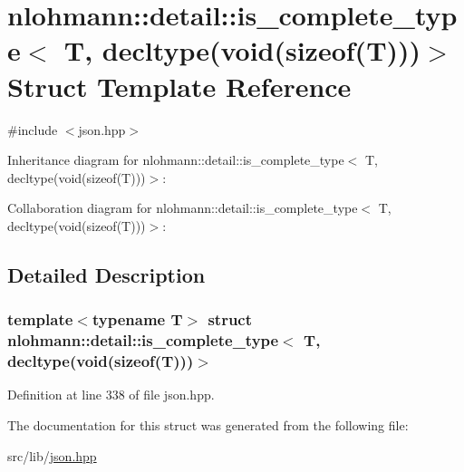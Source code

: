 \hypertarget{structnlohmann_1_1detail_1_1is__complete__type_3_01_t_00_01decltype_07void_07sizeof_07_t_08_08_08_4}{}\section{nlohmann\+:\+:detail\+:\+:is\+\_\+complete\+\_\+type$<$ T, decltype(void(sizeof(T)))$>$ Struct Template Reference}
\label{structnlohmann_1_1detail_1_1is__complete__type_3_01_t_00_01decltype_07void_07sizeof_07_t_08_08_08_4}


{\ttfamily \#include $<$json.\+hpp$>$}



Inheritance diagram for nlohmann\+:\+:detail\+:\+:is\+\_\+complete\+\_\+type$<$ T, decltype(void(sizeof(T)))$>$\+:


Collaboration diagram for nlohmann\+:\+:detail\+:\+:is\+\_\+complete\+\_\+type$<$ T, decltype(void(sizeof(T)))$>$\+:


\subsection{Detailed Description}
\subsubsection*{template$<$typename T$>$\newline
struct nlohmann\+::detail\+::is\+\_\+complete\+\_\+type$<$ T, decltype(void(sizeof(\+T)))$>$}



Definition at line 338 of file json.\+hpp.



The documentation for this struct was generated from the following file\+:\begin{DoxyCompactItemize}
\item 
src/lib/\hyperlink{json_8hpp}{json.\+hpp}\end{DoxyCompactItemize}
